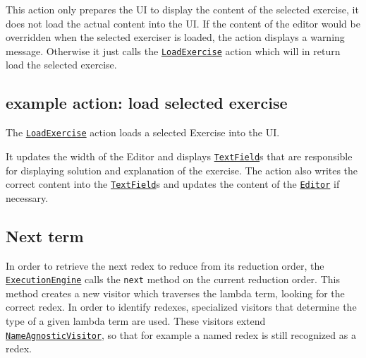 This action only prepares the UI to display the content of the selected exercise, 
it does not load the actual content into the UI. If the content of the editor would 
be overridden when the selected exerciser is loaded, the action displays a warning
message. Otherwise it just calls the \texttt{\hyperref[type:edu.kit.wavelength.client.view.action.LoadExercise]{LoadExercise}} 
action which will in return load the selected exercise.


\subsection{example action: load selected exercise}
The \texttt{\hyperref[type:edu.kit.wavelength.client.view.action.LoadExercise]{LoadExercise}} 
action loads a selected Exercise into the UI.

It updates the width of the Editor and displays \texttt{\hyperref[type:edu.kit.wavelength.client.view.webui.component.TextField]{TextField}}s 
that are responsible for displaying solution and explanation of the exercise.
The action also writes the correct content into the \texttt{\hyperref[type:edu.kit.wavelength.client.view.webui.component.TextField]{TextField}}s and updates the content of the \texttt{\hyperref[type:edu.kit.wavelength.client.view.webui.component.Editor]{Editor}} if necessary.


\subsection{Next term}
\label{sec:nt}
In order to retrieve the next redex to reduce from its reduction order, the
\texttt{\hyperref[type:edu.kit.wavelength.client.model.ExecutionEngine]{ExecutionEngine}}
calls the \texttt{next} method on the current reduction order. This method creates a new visitor which traverses
the lambda term, looking for the correct redex. In order to identify redexes,
specialized visitors that determine the type of a given lambda term are used.
These visitors extend \texttt{\hyperref[type:edu.kit.wavelength.client.model.term.NameAgnosticVisitor]{NameAgnosticVisitor}},
so that for example a named redex is still recognized as a redex.



